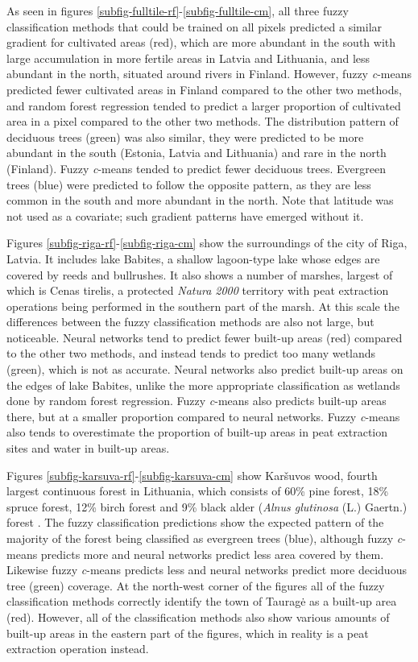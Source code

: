 \documentclass[a4paper,12pt]{scrbook}
\begin{document}
As seen in figures \ref{subfig-fulltile-rf}-\ref{subfig-fulltile-cm}, all three fuzzy classification methods that could be trained on all pixels predicted a similar gradient for cultivated areas (red), which are more abundant in the south with large accumulation in more fertile areas in Latvia and Lithuania, and less abundant in the north, situated around rivers in Finland. However, fuzzy \textit{c}-means predicted fewer cultivated areas in Finland compared to the other two methods, and random forest regression tended to predict a larger proportion of cultivated area in a pixel compared to the other two methods. The distribution pattern of deciduous trees (green) was also similar, they were predicted to be more abundant in the south (Estonia, Latvia and Lithuania) and rare in the north (Finland). Fuzzy \textit{c}-means tended to predict fewer deciduous trees. Evergreen trees (blue) were predicted to follow the opposite pattern, as they are less common in the south and more abundant in the north. Note that latitude was not used as a covariate; such gradient patterns have emerged without it.

Figures \ref{subfig-riga-rf}-\ref{subfig-riga-cm} show the surroundings of the city of Riga, Latvia. It includes lake Babites, a shallow lagoon-type lake whose edges are covered by reeds and bullrushes. It also shows a number of marshes, largest of which is Cenas tirelis, a protected \textit{Natura 2000} territory with peat extraction operations being performed in the southern part of the marsh. At this scale the differences between the fuzzy classification methods are also not large, but noticeable. Neural networks tend to predict fewer built-up areas (red) compared to the other two methods, and instead tends to predict too many wetlands (green), which is not as accurate. Neural networks also predict built-up areas on the edges of lake Babites, unlike the more appropriate classification as wetlands done by random forest regression. Fuzzy \textit{c}-means also predicts built-up areas there, but at a smaller proportion compared to neural networks. Fuzzy \textit{c}-means also tends to overestimate the proportion of built-up areas in peat extraction sites and water in built-up areas.

Figures \ref{subfig-karsuva-rf}-\ref{subfig-karsuva-cm} show Kar\v{s}uvos wood, fourth largest continuous forest in Lithuania, which consists of 60\% pine forest, 18\% spruce forest, 12\% birch forest and 9\% black alder (\textit{Alnus glutinosa} (L.) Gaertn.) forest \citep{lietuviuenciklopedija2006}. The fuzzy classification predictions show the expected pattern of the majority of the forest being classified as evergreen trees (blue), although fuzzy \textit{c}-means predicts more and neural networks predict less area covered by them. Likewise fuzzy \textit{c}-means predicts less and neural networks predict more deciduous tree (green) coverage. At the north-west corner of the figures all of the fuzzy classification methods correctly identify the town of Taurag\.{e} as a built-up area (red). However, all of the classification methods also show various amounts of built-up areas in the eastern part of the figures, which in reality is a peat extraction operation instead.
\end{document}
